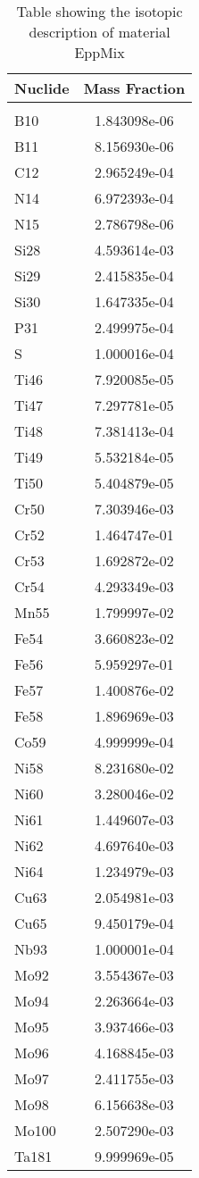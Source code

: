 \begin{centering}
\begin{table}[ht!]
\begin{tabular}{l | c}
\hline
Nuclide & Mass Fraction\\
\hline
\\
B10 & 1.843098e-06\\
B11 & 8.156930e-06\\
C12 & 2.965249e-04\\
N14 & 6.972393e-04\\
N15 & 2.786798e-06\\
Si28 & 4.593614e-03\\
Si29 & 2.415835e-04\\
Si30 & 1.647335e-04\\
P31 & 2.499975e-04\\
S & 1.000016e-04\\
Ti46 & 7.920085e-05\\
Ti47 & 7.297781e-05\\
Ti48 & 7.381413e-04\\
Ti49 & 5.532184e-05\\
Ti50 & 5.404879e-05\\
Cr50 & 7.303946e-03\\
Cr52 & 1.464747e-01\\
Cr53 & 1.692872e-02\\
Cr54 & 4.293349e-03\\
Mn55 & 1.799997e-02\\
Fe54 & 3.660823e-02\\
Fe56 & 5.959297e-01\\
Fe57 & 1.400876e-02\\
Fe58 & 1.896969e-03\\
Co59 & 4.999999e-04\\
Ni58 & 8.231680e-02\\
Ni60 & 3.280046e-02\\
Ni61 & 1.449607e-03\\
Ni62 & 4.697640e-03\\
Ni64 & 1.234979e-03\\
Cu63 & 2.054981e-03\\
Cu65 & 9.450179e-04\\
Nb93 & 1.000001e-04\\
Mo92 & 3.554367e-03\\
Mo94 & 2.263664e-03\\
Mo95 & 3.937466e-03\\
Mo96 & 4.168845e-03\\
Mo97 & 2.411755e-03\\
Mo98 & 6.156638e-03\\
Mo100 & 2.507290e-03\\
Ta181 & 9.999969e-05
\end{tabular}
\caption{Table showing the isotopic description of material EppMix}
\label{table:material_EppMix}
\end{table}\clearpage


\end{centering}
